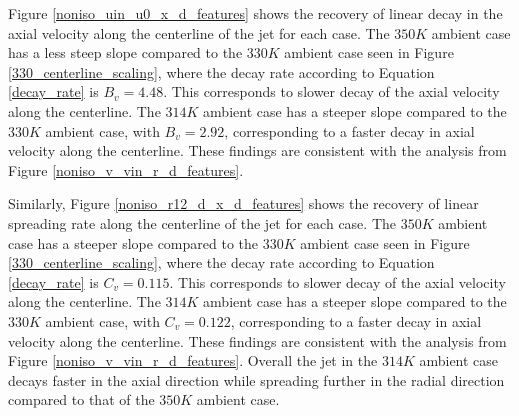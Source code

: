 Figure \ref{noniso_uin_u0_x_d_features} shows the recovery of linear decay in the axial velocity along the centerline of the jet for each case. The $350 K$ ambient case has a less steep slope compared to the $330 K$ ambient case seen in Figure \ref{330_centerline_scaling}, where the decay rate according to Equation \eqref{decay_rate} is $B_v = 4.48$. This corresponds to slower decay of the axial velocity along the centerline. The $314 K$ ambient case has a steeper slope compared to the $330 K$ ambient case, with $B_v = 2.92$, corresponding to a faster decay in axial velocity along the centerline. These findings are consistent with the analysis from Figure \ref{noniso_v_vin_r_d_features}. 

Similarly, Figure \ref{noniso_r12_d_x_d_features} shows the recovery of linear spreading rate along the centerline of the jet for each case. The $350 K$ ambient case has a steeper slope compared to the $330 K$ ambient case seen in Figure \ref{330_centerline_scaling}, where the decay rate according to Equation \eqref{decay_rate} is $C_v = 0.115$. This corresponds to slower decay of the axial velocity along the centerline. The $314 K$ ambient case has a steeper slope compared to the $330 K$ ambient case, with $C_v = 0.122$, corresponding to a faster decay in axial velocity along the centerline. These findings are consistent with the analysis from Figure \ref{noniso_v_vin_r_d_features}. Overall the jet in the $314 K$ ambient case decays faster in the axial direction while spreading further in the radial direction compared to that of the $350 K$ ambient case. 

